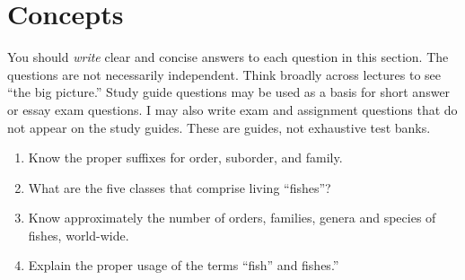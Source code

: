 \documentclass[nofonts, letterpaper]{tufte-handout}
\begin{document}
\section{Concepts}

You should \emph{write} clear and concise answers to each question in this section.  The questions are not necessarily independent.  Think broadly across lectures to see ``the big picture.''  Study guide questions may be used as a basis for short answer or essay exam questions. I may also write exam and assignment questions that do not appear on the study guides. These are guides, not exhaustive test banks.

\begin{enumerate}
	\item Know the proper suffixes for order, suborder, and family.

	\item What are the five classes that comprise living “fishes”?

	\item Know approximately the number of orders, families, genera and species of fishes, world-wide.

	\item Explain the proper usage of the terms “fish” and fishes.”

\end{enumerate}
\end{document}
